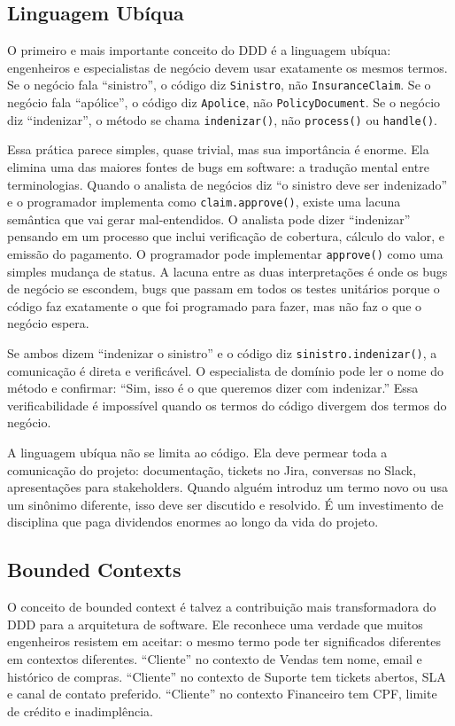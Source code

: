 \subsection{Linguagem Ubíqua}

O primeiro e mais importante conceito do DDD é a linguagem ubíqua: engenheiros
e especialistas de negócio devem usar exatamente os mesmos termos. Se o negócio
fala ``sinistro'', o código diz \texttt{Sinistro}, não \texttt{InsuranceClaim}.
Se o negócio fala ``apólice'', o código diz \texttt{Apolice}, não
\texttt{PolicyDocument}. Se o negócio diz ``indenizar'', o método se chama
\texttt{indenizar()}, não \texttt{process()} ou \texttt{handle()}.

Essa prática parece simples, quase trivial, mas sua importância é enorme.
Ela elimina uma das maiores fontes de bugs em software: a tradução mental
entre terminologias. Quando o analista de negócios diz ``o sinistro deve
ser indenizado'' e o programador implementa como \texttt{claim.approve()},
existe uma lacuna semântica que vai gerar mal-entendidos. O analista pode
dizer ``indenizar'' pensando em um processo que inclui verificação de
cobertura, cálculo do valor, e emissão do pagamento. O programador pode
implementar \texttt{approve()} como uma simples mudança de status. A lacuna
entre as duas interpretações é onde os bugs de negócio se escondem, bugs
que passam em todos os testes unitários porque o código faz exatamente o que
foi programado para fazer, mas não faz o que o negócio espera.

Se ambos dizem ``indenizar o sinistro'' e o código diz
\texttt{sinistro.indenizar()}, a comunicação é direta e verificável.
O especialista de domínio pode ler o nome do método e confirmar: ``Sim, isso
é o que queremos dizer com indenizar.'' Essa verificabilidade é impossível
quando os termos do código divergem dos termos do negócio.

A linguagem ubíqua não se limita ao código. Ela deve permear toda a
comunicação do projeto: documentação, tickets no Jira, conversas no Slack,
apresentações para stakeholders. Quando alguém introduz um termo novo ou usa
um sinônimo diferente, isso deve ser discutido e resolvido. É um investimento
de disciplina que paga dividendos enormes ao longo da vida do projeto.

\subsection{Bounded Contexts}

O conceito de bounded context é talvez a contribuição mais transformadora do
DDD para a arquitetura de software. Ele reconhece uma verdade que muitos
engenheiros resistem em aceitar: o mesmo termo pode ter significados
diferentes em contextos diferentes. ``Cliente'' no contexto de Vendas tem
nome, email e histórico de compras. ``Cliente'' no contexto de Suporte tem
tickets abertos, SLA e canal de contato preferido. ``Cliente'' no contexto
Financeiro tem CPF, limite de crédito e inadimplência.

